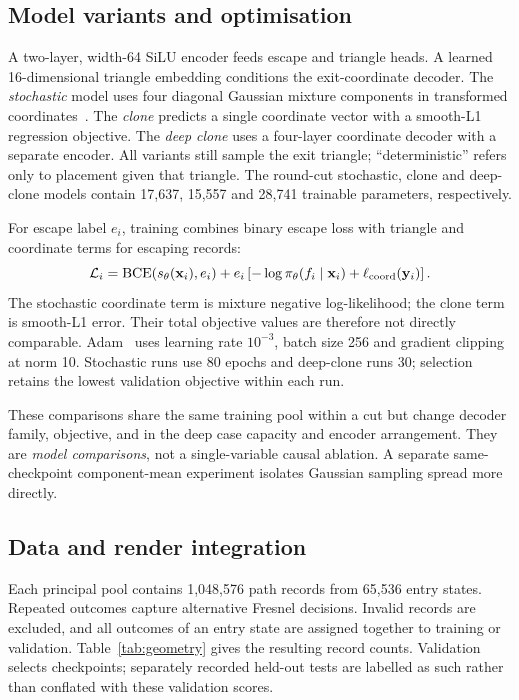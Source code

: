 \documentclass[conference]{IEEEtran}
\begin{document}
\subsection{Model variants and optimisation}
A two-layer, width-64 SiLU encoder feeds escape and triangle heads. A learned
16-dimensional triangle embedding conditions the exit-coordinate decoder. The
\emph{stochastic} model uses four diagonal Gaussian mixture components in
transformed coordinates~\cite{bishop1994}. The \emph{clone} predicts a single
coordinate vector with a smooth-L1 regression objective. The \emph{deep clone}
uses a four-layer coordinate decoder with a separate encoder. All variants still
sample the exit triangle; ``deterministic'' refers only to placement given that
triangle. The round-cut stochastic, clone and deep-clone models contain
17,637, 15,557 and 28,741 trainable parameters, respectively.

For escape label $e_i$, training combines binary escape loss with triangle and
coordinate terms for escaping records:
\begin{equation}
 \mathcal L_i=\operatorname{BCE}(s_\theta(\mathbf{x}_i),e_i)
 +e_i\left[-\log\pi_\theta(f_i\mid\mathbf{x}_i)
 +\ell_{\rm coord}(\mathbf{y}_i)\right].
\end{equation}
The stochastic coordinate term is mixture negative log-likelihood; the clone
term is smooth-L1 error. Their total objective values are therefore not directly
comparable. Adam~\cite{kingma2015} uses learning rate $10^{-3}$, batch size 256
and gradient clipping at norm 10. Stochastic runs use 80 epochs and deep-clone
runs 30; selection retains the lowest validation objective within each run.

These comparisons share the same training pool within a cut but change decoder
family, objective, and in the deep case capacity and encoder arrangement.
They are \emph{model comparisons}, not a single-variable causal ablation. A
separate same-checkpoint component-mean experiment isolates Gaussian sampling
spread more directly.

\subsection{Data and render integration}
Each principal pool contains 1,048,576 path records from 65,536 entry states.
Repeated outcomes capture alternative Fresnel decisions. Invalid records are
excluded, and all outcomes of an entry state are assigned together to training
or validation. Table~\ref{tab:geometry} gives the resulting record counts.
Validation selects checkpoints; separately recorded held-out tests are labelled
as such rather than conflated with these validation scores.
\end{document}
